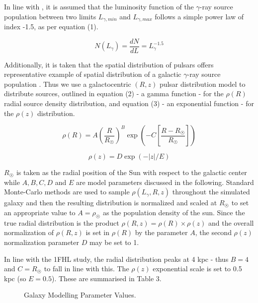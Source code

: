 \documentclass{PoS}
\begin{document}
In line with \cite{Strong}, it is assumed that the luminosity function of the $\gamma$-ray source population between two limits $L_{\gamma, min}$ and $L_{\gamma, max}$ follows a simple power law of index -1.5, as per equation (1).

\begin{equation}
N(L_{\gamma}) = \frac{dN}{dL} = L_{\gamma}^{-1.5}
\end{equation}

Additionally, it is taken that the spatial distribution of pulsars offers representative example of spatial distribution of a galactic $\gamma$-ray source population \cite[p.2]{Strong}. Thus we use a galactocentric $(R, z)$ pulsar distribution model \cite[p.7]{Lorimer} to distribute sources, outlined in equation (2) - a gamma function - for the $\rho(R)$ radial source density distribution, and equation (3) - an exponential function - for the $\rho(z)$ distribution.

\begin{equation}
\rho(R) = A\left(\frac{R}{R_{\astrosun}}\right)^{B} \exp\left(-C\left[\frac{R-R_{\astrosun}}{R_{\astrosun}}\right]\right)
\end{equation}

\begin{equation}
\rho(z) = D \exp(-|z|/E)
\end{equation}

$R_{\astrosun}$ is taken as the radial position of the Sun with respect to the galactic center while $A, B, C, D$ and $E$ are model parameters discussed in the following. Standard Monte-Carlo methods are used to sample $\rho(L_{\gamma}, R, z)$ throughout the simulated galaxy and then the resulting distribution is normalized and scaled at $R_{\astrosun}$ to set an appropriate value to $A = \rho_{\astrosun}$ as the population density of the sun. Since the true radial distribution is the product $\rho(R, z) = \rho(R) \times \rho(z)$ and the overall normalization of $\rho(R, z)$ is set in $\rho(R)$ by the parameter $A$, the second $\rho(z)$ normalization parameter $D$ may be set to 1.

In line with the 1FHL study, the radial distribution peaks at 4 kpc - thus $B = 4$ and $C = R_{\astrosun}$ to fall in line with this. The $\rho(z)$ exponential scale is set to 0.5 kpc (so $E=0.5$).  These are summarised in Table 3. 

\begin{figure}
\centering
{}
\caption{Galaxy Modelling Parameter Values.}
\end{figure}
\end{document}
